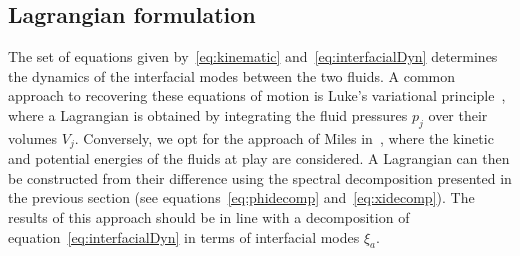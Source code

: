 \documentclass[a4paper]{jpconf}
\begin{document}
\subsection{Lagrangian formulation}

The set of equations given by~\eqref{eq:kinematic} and~\eqref{eq:interfacialDyn} determines the dynamics of the interfacial modes between the two fluids. A common approach to recovering these equations of motion is Luke's variational principle~\cite{luke1967variational}, where a Lagrangian is obtained by integrating the fluid pressures $p_j$ over their volumes $V_j$. Conversely, we opt for the approach of Miles in~\cite{Miles1976NonlinearBasins,Miles1984NonlinearResonance}, where the kinetic and potential energies of the fluids at play are considered. A Lagrangian can then be constructed from their difference using the spectral decomposition presented in the previous section (see equations~\eqref{eq:phidecomp} and~\eqref{eq:xidecomp}). The results of this approach should be in line with a decomposition of equation~\eqref{eq:interfacialDyn} in terms of interfacial modes $\xi_a$.
\end{document}
